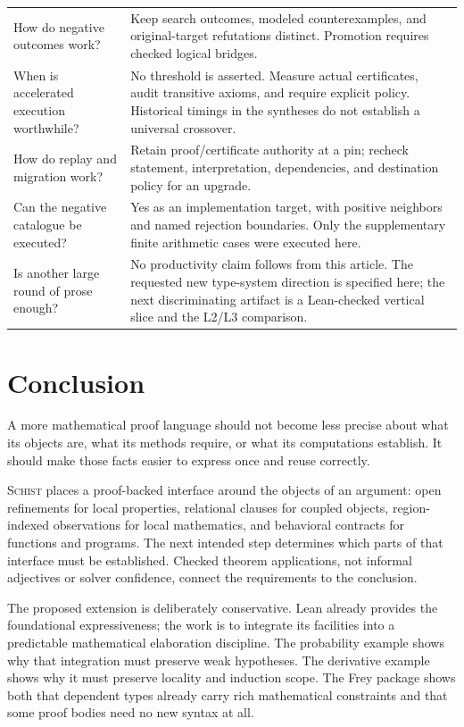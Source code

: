 \documentclass[11pt,a4paper]{article}
\newcommand{\Schist}{\textsc{Schist}}
\theoremstyle{definition}
\begin{document}
\begin{center}
\begin{longtable}{@{}P{42mm}P{111mm}@{}}
How do negative outcomes work? & Keep search outcomes, modeled counterexamples,
and original-target refutations distinct. Promotion requires checked logical bridges.\\
When is accelerated execution worthwhile? & No threshold is asserted. Measure
actual certificates, audit transitive axioms, and require explicit policy.
Historical timings in the syntheses do not establish a universal crossover.\\
How do replay and migration work? & Retain proof/certificate authority at a pin;
recheck statement, interpretation, dependencies, and destination policy for an upgrade.\\
Can the negative catalogue be executed? & Yes as an implementation target,
with positive neighbors and named rejection boundaries. Only the supplementary
finite arithmetic cases were executed here.\\
Is another large round of prose enough? & No productivity claim follows from
this article. The requested new type-system direction is specified here; the
next discriminating artifact is a Lean-checked vertical slice and the L2/L3 comparison.\\
\end{longtable}
\end{center}

\section{Conclusion}\label{sec:conclusion}
A more mathematical proof language should not become less precise about what
its objects are, what its methods require, or what its computations establish.
It should make those facts easier to express once and reuse correctly.

\Schist{} places a proof-backed interface around the objects of an argument:
open refinements for local properties, relational clauses for coupled objects,
region-indexed observations for local mathematics, and behavioral contracts for
functions and programs. The next intended step determines which parts of that
interface must be established. Checked theorem applications, not informal
adjectives or solver confidence, connect the requirements to the conclusion.

The proposed extension is deliberately conservative. Lean already provides
the foundational expressiveness; the work is to integrate its facilities into
a predictable mathematical elaboration discipline. The probability example
shows why that integration must preserve weak hypotheses. The derivative
example shows why it must preserve locality and induction scope. The Frey
package shows both that dependent types already carry rich mathematical
constraints and that some proof bodies need no new syntax at all.
\end{document}
